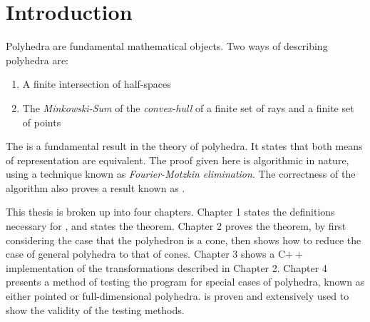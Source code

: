 \chapter*{Introduction}

Polyhedra are fundamental mathematical objects.  Two ways of describing polyhedra are:
\begin{enumerate}
  \item A finite intersection of half-spaces
  \item The \textit{Minkowski-Sum} of the \textit{convex-hull} of a finite set of rays and a finite set of points
\end{enumerate}
The {\MWT} is a fundamental result in the theory of polyhedra.  It states that both means of representation are equivalent.  The proof given here is algorithmic in nature, using a technique known as \textit{Fourier-Motzkin elimination}.  The correctness of the algorithm also proves a result known as .

This thesis is broken up into four chapters.  Chapter 1 states the definitions necessary for {\MWT}, and states the theorem.  Chapter 2 proves the theorem, by first considering the case that the polyhedron is a cone, then shows how to reduce the case of general polyhedra to that of cones.  Chapter 3 shows a C$++$ implementation of the transformations described in Chapter 2.  Chapter 4 presents a method of testing the program for special cases of polyhedra, known as either pointed or full-dimensional polyhedra.   is proven and extensively used to show the validity of the testing methods.
